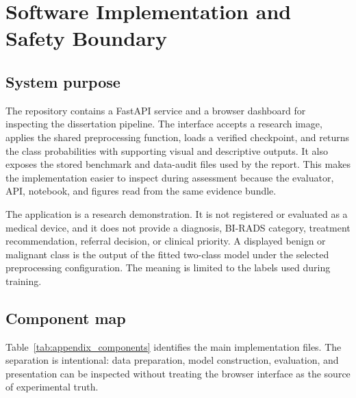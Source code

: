 \chapter[Software Implementation and Safety]{Software Implementation and Safety Boundary}
\label{app:app2}

\section{System purpose}

The repository contains a FastAPI service and a browser dashboard for inspecting the dissertation pipeline. The interface accepts a research image, applies the shared preprocessing function, loads a verified checkpoint, and returns the class probabilities with supporting visual and descriptive outputs. It also exposes the stored benchmark and data-audit files used by the report. This makes the implementation easier to inspect during assessment because the evaluator, API, notebook, and figures read from the same evidence bundle.

The application is a research demonstration. It is not registered or evaluated as a medical device, and it does not provide a diagnosis, BI-RADS category, treatment recommendation, referral decision, or clinical priority. A displayed benign or malignant class is the output of the fitted two-class model under the selected preprocessing configuration. The meaning is limited to the labels used during training.

\section{Component map}

Table~\ref{tab:appendix_components} identifies the main implementation files. The separation is intentional: data preparation, model construction, evaluation, and presentation can be inspected without treating the browser interface as the source of experimental truth.

